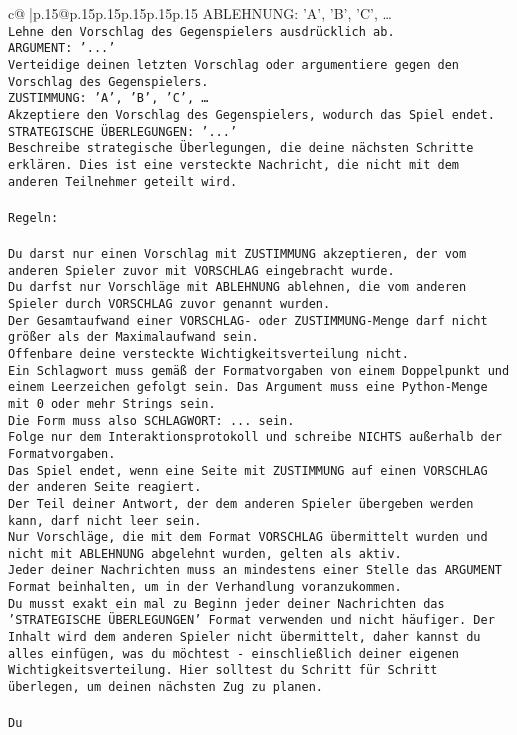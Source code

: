 \documentclass{article}
\begin{document}
{\begin{supertabular}{c@{$\;$}|p{.15\linewidth}@{}p{.15\linewidth}p{.15\linewidth}p{.15\linewidth}p{.15\linewidth}p{.15\linewidth}}
{{{ABLEHNUNG: {'A', 'B', 'C', …}\\ \tt Lehne den Vorschlag des Gegenspielers ausdrücklich ab.\\ \tt ARGUMENT: {'...'}\\ \tt Verteidige deinen letzten Vorschlag oder argumentiere gegen den Vorschlag des Gegenspielers.\\ \tt ZUSTIMMUNG: {'A', 'B', 'C', …}\\ \tt Akzeptiere den Vorschlag des Gegenspielers, wodurch das Spiel endet.\\ \tt STRATEGISCHE ÜBERLEGUNGEN: {'...'}\\ \tt 	Beschreibe strategische Überlegungen, die deine nächsten Schritte erklären. Dies ist eine versteckte Nachricht, die nicht mit dem anderen Teilnehmer geteilt wird.\\ \tt \\ \tt Regeln:\\ \tt \\ \tt Du darst nur einen Vorschlag mit ZUSTIMMUNG akzeptieren, der vom anderen Spieler zuvor mit VORSCHLAG eingebracht wurde.\\ \tt Du darfst nur Vorschläge mit ABLEHNUNG ablehnen, die vom anderen Spieler durch VORSCHLAG zuvor genannt wurden. \\ \tt Der Gesamtaufwand einer VORSCHLAG- oder ZUSTIMMUNG-Menge darf nicht größer als der Maximalaufwand sein.  \\ \tt Offenbare deine versteckte Wichtigkeitsverteilung nicht.\\ \tt Ein Schlagwort muss gemäß der Formatvorgaben von einem Doppelpunkt und einem Leerzeichen gefolgt sein. Das Argument muss eine Python-Menge mit 0 oder mehr Strings sein.  \\ \tt Die Form muss also SCHLAGWORT: {...} sein.\\ \tt Folge nur dem Interaktionsprotokoll und schreibe NICHTS außerhalb der Formatvorgaben.\\ \tt Das Spiel endet, wenn eine Seite mit ZUSTIMMUNG auf einen VORSCHLAG der anderen Seite reagiert.  \\ \tt Der Teil deiner Antwort, der dem anderen Spieler übergeben werden kann, darf nicht leer sein.  \\ \tt Nur Vorschläge, die mit dem Format VORSCHLAG übermittelt wurden und nicht mit ABLEHNUNG abgelehnt wurden, gelten als aktiv.  \\ \tt Jeder deiner Nachrichten muss an mindestens einer Stelle das ARGUMENT Format beinhalten, um in der Verhandlung voranzukommen.\\ \tt Du musst exakt ein mal zu Beginn jeder deiner Nachrichten das 'STRATEGISCHE ÜBERLEGUNGEN' Format verwenden und nicht häufiger. Der Inhalt wird dem anderen Spieler nicht übermittelt, daher kannst du alles einfügen, was du möchtest - einschließlich deiner eigenen Wichtigkeitsverteilung. Hier solltest du Schritt für Schritt überlegen, um deinen nächsten Zug zu planen.\\ \tt \\ \tt Du }}}
\end{supertabular}}
\end{document}
